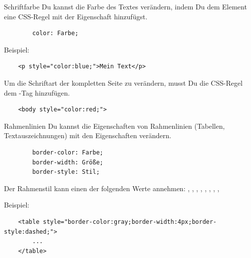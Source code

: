 \documentclass[lerntheke,12pt,a5paper,landscape]{arbeitsblatt}
\begin{document}
\leereKarte

\begin{karte1}{Schriftfarbe}
	Du kannst die Farbe des Textes verändern, indem Du dem Element eine CSS-Regel mit der Eigenschaft  hinzufügst.

	\begin{verbatim}
		color: Farbe;
	\end{verbatim}

	Beispiel:
	\begin{verbatim}
	<p style="color:blue;">Mein Text</p>
	\end{verbatim}

	Um die Schriftart der kompletten Seite zu verändern, musst Du die CSS-Regel dem -Tag hinzufügen.

	\begin{verbatim}
	<body style="color:red;">
	\end{verbatim}
\end{karte1}

\leereKarte

\begin{karte2}{Rahmenlinien}
	\label{karte:linien}
	Du kannst die Eigenschaften von Rahmenlinien (Tabellen, Textauszeichnungen) mit den  Eigenschaften verändern.

	\begin{verbatim}
		border-color: Farbe;
		border-width: Größe;
		border-style: Stil;
	\end{verbatim}

	Der Rahmenstil kann einen der folgenden Werte annehmen: , , , , , , , , 

	Beispiel:
	\begin{verbatim}
	<table style="border-color:gray;border-width:4px;border-style:dashed;">
		...
	</table>
	\end{verbatim}
\end{karte2}
\end{document}
